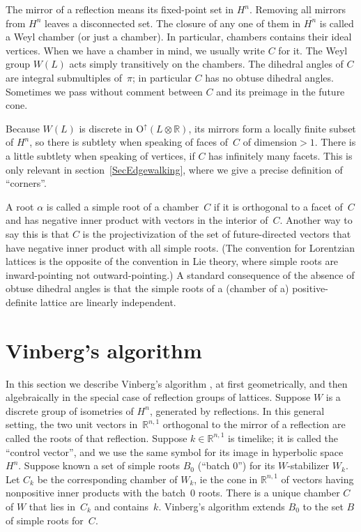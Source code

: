 \documentclass[12pt]{amsart}
\def\R{\mathbb{R}}
\def\O{\mathrm{O}}
\def\Oup{\O^{\uparrow}}
\def\tensor{\otimes}
\numberwithin{theorem}{section}
\numberwithin{equation}{section}
\numberwithin{figure}{section}
\theoremstyle{remark}
\begin{document}
The mirror of a reflection
means its fixed-point set in
$H^n$.  Removing all mirrors from $H^n$ leaves a disconnected set.  The closure
of any one of them in $\overline{H^n}$ is called a Weyl chamber (or just a chamber).  
In particular, chambers contains their ideal vertices.
When we have a chamber in mind,
we usually write $C$ for it.  The Weyl group $W(L)$ acts
simply transitively on the chambers.  
The dihedral angles of $C$ are 
integral submultiples of~$\pi$; in particular $C$ has no obtuse
dihedral angles.    Sometimes we pass without comment 
between $C$ and its preimage in
 the future cone.

Because $W(L)$ is discrete in $\Oup(L\tensor\R)$, its mirrors form a locally
finite subset of $H^n$, 
so there is subtlety when speaking of faces of~$C$ of dimension${}>1$.
There is a little subtlety when speaking of vertices, if 
$C$ has infinitely many facets.  This is only relevant in
section~\ref{SecEdgewalking}, where we give a precise definition of ``corners''.

A root $\alpha$ is called a simple root of a chamber~$C$ 
if it is orthogonal to a facet of~$C$ and has negative inner product
with vectors in the interior of~$C$.  Another way to say this is that 
$C$ is the 
projectivization of the set of future-directed vectors that have negative
inner product with all simple roots.
(The convention for Lorentzian lattices is the opposite of the
convention in Lie theory, where simple roots are inward-pointing not
outward-pointing.)
A standard consequence of the absence of obtuse dihedral angles
is that the simple roots of a (chamber of a) positive-definite
lattice are linearly independent.

\section{Vinberg's algorithm}
\label{SecVinberg}

\noindent
In this section we describe Vinberg's algorithm \cite[\S3.2]{VinbergOnTheGroups}, at first
geometrically, and then algebraically
in the special case of
reflection groups of lattices. Suppose $W$ is a discrete group
of isometries of $H^n$, generated by reflections.  In this
general setting,  the two unit vectors in~$\R^{n,1}$
orthogonal to
the mirror of a reflection are called the roots of that reflection.
Suppose 
$k\in\R^{n,1}$ 
is timelike; it is called the ``control vector'', and
we use the same symbol
for its image in hyperbolic space $H^n$.  
Suppose known a set of simple roots $B_0$ (``batch 0'')
for its $W$-stabilizer $W_k$.  Let $C_k$ be the corresponding
chamber of $W_k$, ie the cone in $\R^{n,1}$
of vectors having nonpositive inner products with the batch~$0$
roots.  There is a unique chamber $C$ of $W$ that lies in~$C_k$
and contains~$k$.  
Vinberg's algorithm extends $B_0$ to the set $B$ of simple roots for~$C$.
\end{document}
